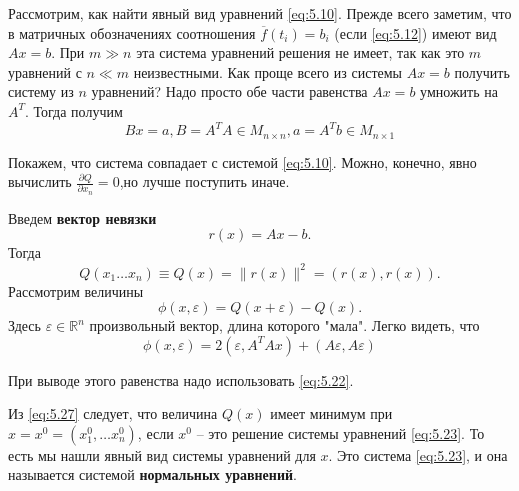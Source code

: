 Рассмотрим, как найти явный вид уравнений \ref{eq:5.10}. Прежде всего заметим, что в матричных обозначениях соотношения $\overline f(t_i) = b_i$ (если \ref{eq:5.12}) имеют вид $Ax=b$. При $m\gg n$ эта система уравнений решения не имеет, так как это $m$ уравнений с $n \ll m$ неизвестными. Как проще всего из системы $Ax=b$ получить систему из $n$ уравнений? Надо просто обе части равенства $Ax=b$ умножить на $A^T$. Тогда получим
\begin{equation}\label{eq:5.23}
	Bx = a, B = A^T A \in M_{n\times n}, a=A^T b \in M_{n\times 1}
\end{equation}

Покажем, что система совпадает с системой \ref{eq:5.10}. Можно, конечно, явно вычислить $\frac{\partial Q}{\partial x_n} = 0$,но лучше поступить иначе.

Введем \textbf{вектор невязки}
\begin{equation}
	r(x) = Ax - b.
\end{equation}
Тогда
\begin{equation}
	Q(x_1 \dots x_n) \equiv Q(x) = \|r(x)\| ^2 = (r(x), r(x)).
\end{equation}
Рассмотрим величины
\begin{equation}
	\phi (x, \varepsilon ) = Q (x + \varepsilon ) - Q(x).
\end{equation}
Здесь $\varepsilon \in \mathbb{R}^n$ произвольный вектор, длина которого "мала". Легко видеть, что
\begin{equation}\label{eq:5.27}
	\phi (x, \varepsilon ) = 2(\varepsilon, A^T A x) + (A\varepsilon, A\varepsilon)
\end{equation}

При выводе этого равенства надо использовать \ref{eq:5.22}.

Из \ref{eq:5.27} следует, что величина $Q(x)$ имеет минимум при $x = x^0 = (x_1^0, \dots x_n^0)$, если $x^0$ -- это решение системы уравнений \ref{eq:5.23}.
То есть мы нашли явный вид системы уравнений для $x$. Это система \ref{eq:5.23}, и она называется системой \textbf{нормальных уравнений}.